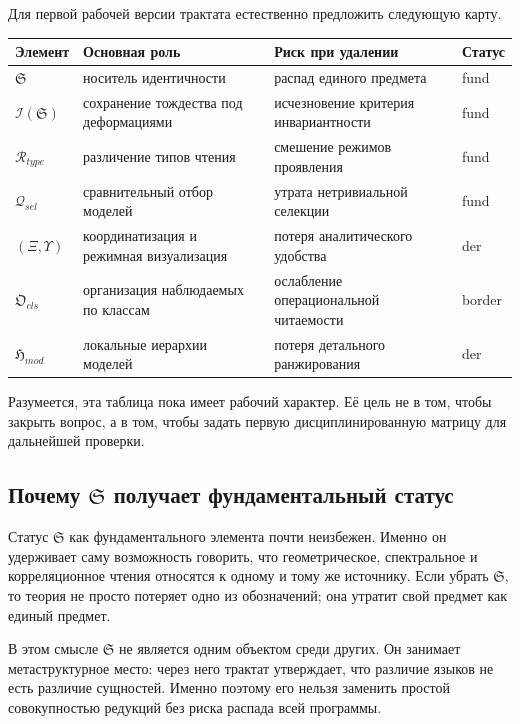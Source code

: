 \documentclass[12pt,a4paper]{article}
\begin{document}
Для первой рабочей версии трактата естественно предложить следующую карту.

\begin{center}
\begin{tabular}{|>{\raggedright\arraybackslash}p{2.4cm}|>{\raggedright\arraybackslash}p{3.8cm}|>{\raggedright\arraybackslash}p{5.4cm}|>{\raggedright\arraybackslash}p{2.0cm}|}
\hline
Элемент & Основная роль & Риск при удалении & Статус \\
\hline
\(\mathfrak{S}\) & носитель идентичности & распад единого предмета & fund \\
\hline
\(\mathcal{I}(\mathfrak{S})\) & сохранение тождества под деформациями & исчезновение критерия инвариантности & fund \\
\hline
\(\mathcal{R}_{type}\) & различение типов чтения & смешение режимов проявления & fund \\
\hline
\(\mathcal{Q}_{sel}\) & сравнительный отбор моделей & утрата нетривиальной селекции & fund \\
\hline
\((\Xi,\Upsilon)\) & координатизация и режимная визуализация & потеря аналитического удобства & der \\
\hline
\(\mathfrak{O}_{cls}\) & организация наблюдаемых по классам & ослабление операциональной читаемости & border \\
\hline
\(\mathfrak{H}_{mod}\) & локальные иерархии моделей & потеря детального ранжирования & der \\
\hline
\end{tabular}
\end{center}

Разумеется, эта таблица пока имеет рабочий характер. Её цель не в том, чтобы закрыть вопрос, а в том, чтобы задать первую дисциплинированную матрицу для дальнейшей проверки.

\subsection{Почему \texorpdfstring{$\mathfrak{S}$}{S} получает фундаментальный статус}

Статус \(\mathfrak{S}\) как фундаментального элемента почти неизбежен. Именно он удерживает саму возможность говорить, что геометрическое, спектральное и корреляционное чтения относятся к одному и тому же источнику. Если убрать \(\mathfrak{S}\), то теория не просто потеряет одно из обозначений; она утратит свой предмет как единый предмет.

В этом смысле \(\mathfrak{S}\) не является одним объектом среди других. Он занимает метаструктурное место: через него трактат утверждает, что различие языков не есть различие сущностей. Именно поэтому его нельзя заменить простой совокупностью редукций без риска распада всей программы.
\end{document}
